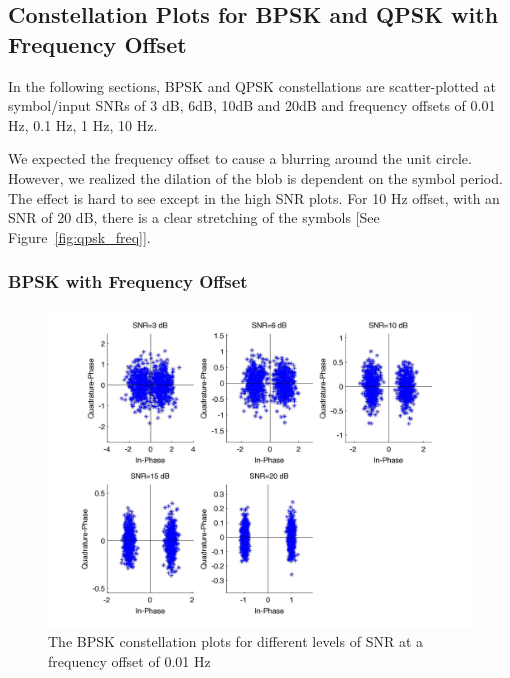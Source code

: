 \documentclass[]{article}
\begin{document}
\subsection{Constellation Plots for BPSK and QPSK with Frequency Offset}
In the following sections,  BPSK and QPSK constellations are scatter-plotted at symbol/input SNRs of 3 dB, 6dB, 10dB and 20dB and frequency offsets of 0.01 Hz, 0.1 Hz, 1 Hz, 10 Hz.

We expected the frequency offset to cause a blurring around the unit circle.  However, we realized the dilation of the blob is dependent on the symbol period.  The effect is hard to see except in the high SNR plots.  For 10 Hz offset, with an SNR of 20 dB, there is a clear stretching of the symbols [See Figure~\ref{fig:qpsk_freq}].    

\subsubsection{BPSK with Frequency Offset}
\label{sec:bpsk_freqConst}
\begin{figure}[H]
\centering
\hspace*{-2cm}\includegraphics[width=1.3\textwidth]{bpConstfo1.jpg}
\caption{The BPSK constellation plots for different levels of SNR at a frequency offset of 0.01 Hz}
\end{figure}
\end{document}

